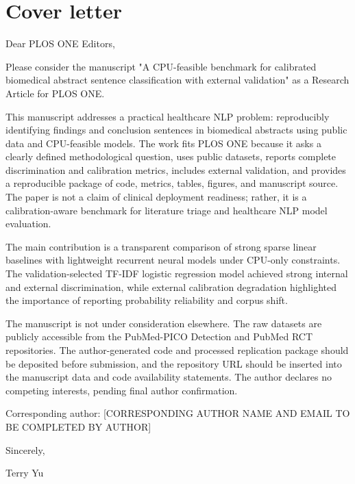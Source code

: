 \section*{Cover letter}

Dear PLOS ONE Editors,

Please consider the manuscript "A CPU-feasible benchmark for calibrated biomedical abstract sentence classification with external validation" as a Research Article for PLOS ONE.

This manuscript addresses a practical healthcare NLP problem: reproducibly identifying findings and conclusion sentences in biomedical abstracts using public data and CPU-feasible models. The work fits PLOS ONE because it asks a clearly defined methodological question, uses public datasets, reports complete discrimination and calibration metrics, includes external validation, and provides a reproducible package of code, metrics, tables, figures, and manuscript source. The paper is not a claim of clinical deployment readiness; rather, it is a calibration-aware benchmark for literature triage and healthcare NLP model evaluation.

The main contribution is a transparent comparison of strong sparse linear baselines with lightweight recurrent neural models under CPU-only constraints. The validation-selected TF-IDF logistic regression model achieved strong internal and external discrimination, while external calibration degradation highlighted the importance of reporting probability reliability and corpus shift.

The manuscript is not under consideration elsewhere. The raw datasets are publicly accessible from the PubMed-PICO Detection and PubMed RCT repositories. The author-generated code and processed replication package should be deposited before submission, and the repository URL should be inserted into the manuscript data and code availability statements. The author declares no competing interests, pending final author confirmation.

Corresponding author: [CORRESPONDING AUTHOR NAME AND EMAIL TO BE COMPLETED BY AUTHOR]

Sincerely,

Terry Yu
